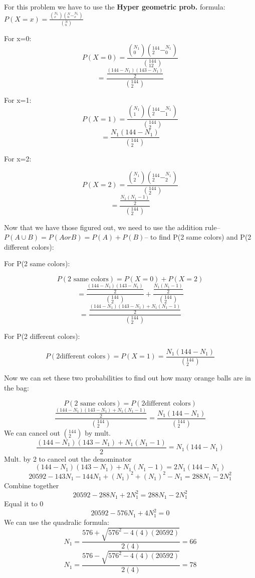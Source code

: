 \documentclass{article}
\begin{document}
For this problem we have to use the \textbf{Hyper geometric prob.} formula: $P(X=x)=\frac{(^{N_{1}}_{x})(^{N}_{n}-^{N_{1}}_{x})}{(^{N}_{n})}$

\vspace{2mm}

For x=0:
$$P(X=0)=\frac{(^{N_{1}}_{0})(^{144}_{2}-^{N_{1}}_{0})}{(^{144}_{12})}$$
$$=\frac{\frac{(144-N_{1})(143-N_{1})}{2}}{(^{144}_{2})}$$

For x=1:
$$P(X=1)=\frac{(^{N_{1}}_{1})(^{144}_{2}-^{N_{1}}_{1})}{(^{144}_{2})}$$
$$=\frac{N_{1}(144-N_{1})}{(^{144}_{2})}$$

For x=2:

$$P(X=2)=\frac{(^{N_{1}}_{2})(^{144}_{2}-^{N_{1}}_{2})}{(^{144}_{2})}$$
$$=\frac{\frac{N_{1}(N_{1}-1)}{2}}{(^{144}_{2})}$$


Now that we have those figured out, we need to use the addition rule--$P(A \cup B)=P(A or B)=P(A)+P(B)$-- to find P(2 same colors) and P(2 different colors):

\vspace{2mm}

For P(2 same colors):

$$P(\text{2 same colors})=P(X=0)+P(X=2)$$
$$=\frac{\frac{(144-N_{1})(143-N_{1})}{2}}{(^{144}_{2})}+\frac{\frac{N_{1}(N_{1}-1)}{2}}{(^{144}_{2})}$$
$$=\frac{\frac{(144-N_{1})(143-N_{1})+N_{1}(N_{1}-1)}{2}}{(^{144}_{2})}$$

\vspace{3mm}

For P(2 different colors):

$$P(2 \text{different colors})=P(X=1)=\frac{N_{1}(144-N_{1})}{(^{144}_{2})}$$

Now we can set these two probabilities to find out how many orange balls are in the bag:

$$P(\text{2 same colors})=P(2 \text{different colors})$$
$$\frac{\frac{(144-N_{1})(143-N_{1})+N_{1}(N_{1}-1)}{2}}{(^{144}_{2})}=\frac{N_{1}(144-N_{1})}{(^{144}_{2})}$$
We can cancel out $(^{144}_{2})$ by mult.
$$\frac{(144-N_{1})(143-N_{1})+N_{1}(N_{1}-1)}{2}=N_{1}(144-N_{1})$$
Mult. by 2 to cancel out the denominator
$$(144-N_{1})(143-N_{1})+N_{1}(N_{1}-1)=2N_{1}(144-N_{1})$$
$$20592-143N_{1}-144N_{1}+(N_{1})^{2}+(N_{1})^{2}-N_{1}=288N_{1}-2N_{1}^{2}$$
Combine together
$$20592-288N_{1}+2N_{1}^{2}=288N_{1}-2N_{1}^{2}$$
Equal it to 0
$$20592-576N_{1}+4N_{1}^{2}=0$$
We can use the quadralic formula:
$$N_{1}=\frac{576+\sqrt{576^{2}-4(4)(20592)}}{2(4)}=66$$
$$N_{1}=\frac{576-\sqrt{576^{2}-4(4)(20592)}}{2(4)}=78$$
\end{document}
